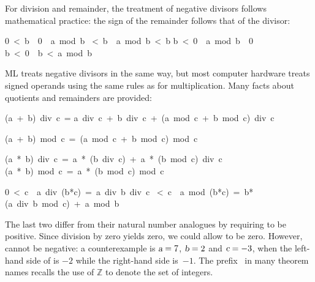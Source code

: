 For division and remainder,
the treatment of negative divisors follows
mathematical practice: the sign of the remainder follows that
of the divisor:
\begin{isabelle}
0\ <\ b\ \isasymLongrightarrow \ 0\ \isasymle \ a\ mod\ b%
\ <\ b\ \isasymLongrightarrow \ a\ mod\ b\ <\ b%
\isanewline
b\ <\ 0\ \isasymLongrightarrow \ a\ mod\ b\ \isasymle \ 0
\isanewline
b\ <\ 0\ \isasymLongrightarrow \ b\ <\ a\ mod\ b%
\end{isabelle}
ML treats negative divisors in the same way, but most computer hardware
treats signed operands using the same rules as for multiplication.
Many facts about quotients and remainders are provided:
\begin{isabelle}
(a\ +\ b)\ div\ c\ =\isanewline
a\ div\ c\ +\ b\ div\ c\ +\ (a\ mod\ c\ +\ b\ mod\ c)\ div\ c%
\par\smallskip
(a\ +\ b)\ mod\ c\ =\ (a\ mod\ c\ +\ b\ mod\ c)\ mod\ c%
\end{isabelle}

\begin{isabelle}
(a\ *\ b)\ div\ c\ =\ a\ *\ (b\ div\ c)\ +\ a\ *\ (b\ mod\ c)\ div\ c%
\isanewline
(a\ *\ b)\ mod\ c\ =\ a\ *\ (b\ mod\ c)\ mod\ c%
\end{isabelle}

\begin{isabelle}
0\ <\ c\ \isasymLongrightarrow \ a\ div\ (b*c)\ =\ a\ div\ b\ div\ c%
\ <\ c\ \isasymLongrightarrow \ a\ mod\ (b*c)\ =\ b*(a\ div\ b\ mod\
c)\ +\ a\ mod\ b%
\end{isabelle}
The last two differ from their natural number analogues by requiring
 to be positive.  Since division by zero yields zero, we could allow
\isa{c} to be zero.  However, \isa{c} cannot be negative: a counterexample
is
$\emph{\sl a} = 7$, $\emph{\sl b} = 2$ and $\emph{\sl c} = -3$, when the left-hand side of
\isa{zdiv_zmult2_eq} is $-2$ while the right-hand side is~$-1$.
The prefix~ in many theorem names recalls the use of $\mathbb{Z}$ to
denote the set of integers.%


